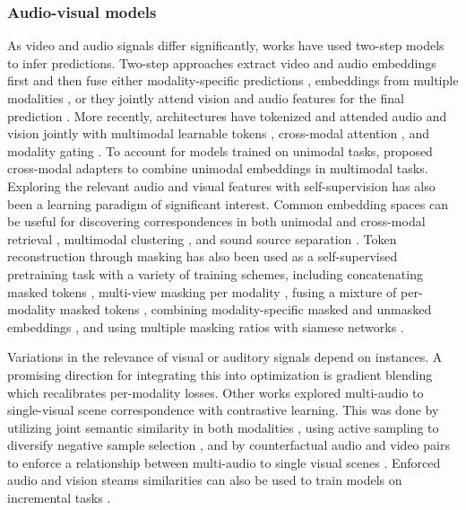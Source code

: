 \subsubsection{Audio-visual models} 
\label{sec:recognition::audio:::avmodels}

As video and audio signals differ significantly, works have used two-step models to infer predictions. Two-step approaches extract video and audio embeddings first and then fuse either modality-specific predictions , embeddings from multiple modalities , or they jointly attend vision and audio features for the final prediction . More recently, architectures have tokenized and attended audio and vision jointly with multimodal learnable tokens , cross-modal attention , and modality gating . To account for models trained on unimodal tasks,  proposed cross-modal adapters to combine unimodal embeddings in multimodal tasks. Exploring the relevant audio and visual features with self-supervision has also been a learning paradigm of significant interest. Common embedding spaces can be useful for discovering correspondences in both unimodal and cross-modal retrieval , multimodal clustering , and sound source separation . Token reconstruction through masking has also been used as a self-supervised pretraining task with a variety of training schemes, including concatenating masked tokens , multi-view masking per modality , fusing a mixture of per-modality masked tokens , combining modality-specific masked and unmasked embeddings , and using multiple masking ratios with siamese networks . 

Variations in the relevance of visual or auditory signals depend on instances. A promising direction for integrating this into optimization is gradient blending  which recalibrates per-modality losses. Other works explored multi-audio to single-visual scene correspondence with contrastive learning. This was done by utilizing joint semantic similarity in both modalities , using active sampling to diversify negative sample selection
, and by counterfactual audio and video pairs to enforce a relationship between multi-audio to single visual scenes . Enforced audio and vision steams similarities can also be used to train models on incremental tasks .



